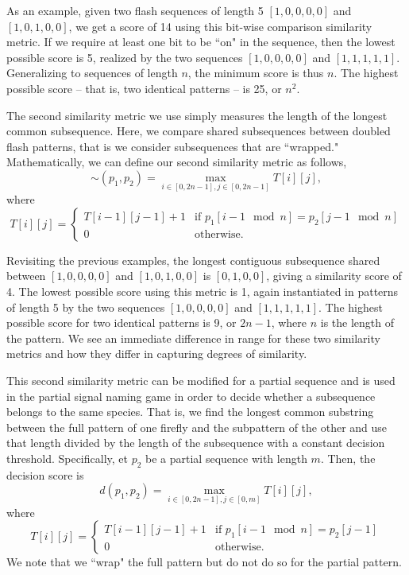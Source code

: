 As an example, given two flash sequences of length 5 $[1,0,0,0,0]$ and $[1,0,1,0,0]$, we get a score of 14 using this bit-wise comparison similarity metric. 
If we require at least one bit to be ``on" in the sequence, then the lowest possible score is 5, realized by the two sequences $[1,0,0,0,0]$ and $[1,1,1,1,1]$. Generalizing to sequences of length $n$, the minimum score is thus $n$. 
The highest possible score -- that is, two identical patterns -- is 25, or $n^2$.

The second similarity metric we use simply measures the length of the longest common subsequence. Here, we compare shared subsequences between doubled flash patterns, that is we consider subsequences that are ``wrapped." 
 Mathematically, we can define our second similarity metric as follows,
\[ \sim (p_1, p_2) =  \max _{i \in [0,2n-1], j \in [0,2n-1]} T[i][j], \] 
where {\tiny \[ T[i][j] = \begin{cases} T[i-1][j-1] + 1 &\textrm{if } p_1[i-1 \mod n] = p_2[j-1 \mod n] \\
	0 &\textrm{otherwise.} \end{cases}\]}
	
Revisiting the previous examples, the longest contiguous subsequence shared between $[1,0,0,0,0]$ and $[1,0,1,0,0]$ is $[0,1,0,0]$, giving a similarity score of 4. 
The lowest possible score using this metric is 1, again instantiated in patterns of length 5 by the two sequences $[1,0,0,0,0]$ and $[1,1,1,1,1]$. 
The highest possible score for two identical patterns is 9, or $2n-1$, where $n$ is the length of the pattern. 
We see an immediate difference in range for these two similarity metrics and how they differ in capturing degrees of similarity. 

This second similarity metric can be modified for a partial sequence and is used in the partial signal naming game in order to decide whether a subsequence belongs to the same species. 
That is, we find the longest common substring between the full pattern of one firefly and the subpattern of the other and use that length divided by the length of the subsequence with a constant decision threshold. 
Specifically, et $p_2$ be a partial sequence with length $m$. Then, the decision score is 
\[ d(p_1, p_2) = \max _{i \in [0,2n-1], j \in [0,m]} T[i][j], \] 
where {\tiny \[ T[i][j] = \begin{cases} T[i-1][j-1] + 1 &\textrm{if } p_1[i-1 \mod n] = p_2[j-1] \\
	0 &\textrm{otherwise.} \end{cases}\]}
We note that we ``wrap" the full pattern but do not do so for the partial pattern. 

